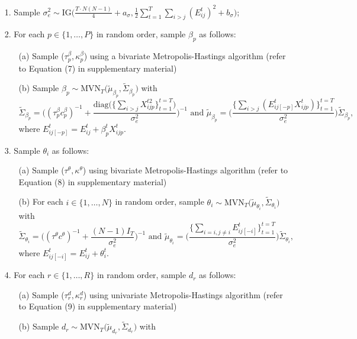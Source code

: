 \documentclass[a4paper]{article}
\begin{document}
	\begin{itemize}
		\item [1.] Sample $\sigma_e^2 \sim \mbox{IG}\big(\frac{T\cdot N(N-1)}{4}+a_\sigma, \frac{1}{2}\sum\limits_{t=1}^T\sum\limits_{i> j}(E^t_{ij})^2 + b_\sigma\big)$;
		\item [2.] For each $p \in \{1,\ldots,P\}$ in random order, sample $\beta_{p}$ as follows:
		\begin{enumerate} 
			\item [(a)] Sample ($\tau^{\beta}_p ,  \kappa^\beta_p$) using a bivariate Metropolis-Hastings algorithm (refer to Equation (7) in supplementary material)
			\item [(b)] Sample $\beta_{p} \sim \mbox{MVN}_T\big(\tilde{\mu}_{\beta_p}, \tilde{\Sigma}_{\beta_p} \big)$ with 
			$$\tilde{\Sigma}_{\beta_p} = \Big((\tau^{\beta}_pc^\beta_p)^{-1}+\frac{\mbox{diag}\big(\{\sum_{i>j}{X^{t2}_{ijp}}\}_{t=1}^{t=T}\big)}{\sigma_e^2}\Big)^{-1} \mbox{ and } \tilde{\mu}_{\beta_p} =  \Big(\frac{\{\sum_{i>j}(E^{t}_{ij[-p]}X^t_{ijp})\}_{t=1}^{t=T}}{\sigma_e^2}\Big)\tilde{\Sigma}_{\beta_p},$$ 
			where $E^{t}_{ij[-p]}=E^t_{ij}+\beta^t_{p}X^{t}_{ijp}$.						
		\end{enumerate}
		\item [3.] Sample $\theta_{i}$ as follows:
		\begin{enumerate}
			\item [(a)] Sample ($\tau^{\theta},  \kappa^\theta$) using bivariate Metropolis-Hastings algorithm (refer to Equation (8) in supplementary material)
			\item [(b)] For each $i \in \{1,\ldots,N\}$ in random order, sample $\theta_{i} \sim \mbox{MVN}_T\big(\tilde{\mu}_{\theta_i}, \tilde{\Sigma}_{\theta_i} \big)$ with
			$$\tilde{\Sigma}_{\theta_i} = \Big((\tau^\theta c^\theta)^{-1}+\frac{(N-1)I_T}{\sigma_e^2}\Big)^{-1} \mbox{ and }
			\tilde{\mu}_{\theta_i} = \Big(\frac{\{\sum_{i=i, j\neq i}E^{t}_{ij[-i]}\}_{t=1}^{t=T}}{\sigma_e^2}\Big)\tilde{\Sigma}_{\theta_i},$$ where $E^{t}_{ij[-i]}=E^t_{ij}+\theta^t_{i}.$
		\end{enumerate}
		\item [4.] For each $r \in \{1,\ldots,R\}$ in random order, sample $d_{r}$ as follows:
		\begin{enumerate}
			\item [(a)] Sample  ($\tau_r^{d},  \kappa_r^d$)  using univariate Metropolis-Hastings algorithm (refer to Equation (9) in supplementary material)
			\item [(b)] Sample $d_{r} \sim \mbox{MVN}_T\big(\tilde{\mu}_{d_r}, \tilde{\Sigma}_{d_r} \big)$ with

\end{enumerate}
\end{itemize}
\end{document}
